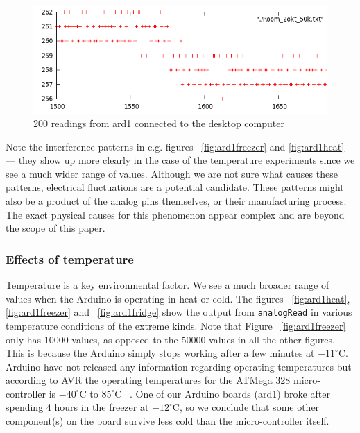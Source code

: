 \documentclass[a4paper]{article}           %
\begin{document}
\begin{figure}[h!]


  \centering
  \includegraphics[width=0.7\columnwidth]{img/Room_1500-1700_zoom.png}
  \caption{200 readings from ard1 connected to the desktop computer}
  \label{fig:ardzoom}

\end{figure}


Note the interference patterns in e.g. figures ~\ref{fig:ard1freezer} and \ref{fig:ard1heat} --- they show up more clearly in the case of the temperature experiments since we see a much wider range of values. Although we are not sure what causes these patterns, electrical fluctuations are a potential candidate. These patterns might also be a product of the analog pins themselves, or their manufacturing process. The exact physical causes for this phenomenon appear complex and are beyond the scope of this paper. 

\FloatBarrier
\subsubsection{Effects of temperature}
\FloatBarrier

Temperature is a key environmental factor. We see a much broader range of values when the Arduino is operating in heat or cold. The figures ~\ref{fig:ard1heat}, \ref{fig:ard1freezer} and ~\ref{fig:ard1fridge} show the output from \texttt{analogRead} in various temperature conditions of the extreme kinds. Note that Figure ~\ref{fig:ard1freezer} only has 10000 values, as opposed to the 50000 values in all the other figures. This is because the Arduino simply stops working after a few minutes at $-11^\circ$C. Arduino have not released any information regarding operating temperatures but according to AVR the operating temperatures for the ATMega 328 micro-controller is $-40^\circ$C to $85^\circ$C  ~\cite{atmegads}. One of our Arduino boards (ard1) broke after spending 4 hours in the freezer at $-12^\circ$C, so we conclude that some other component(s) on the board survive less cold than the micro-controller itself. 
\end{document}
